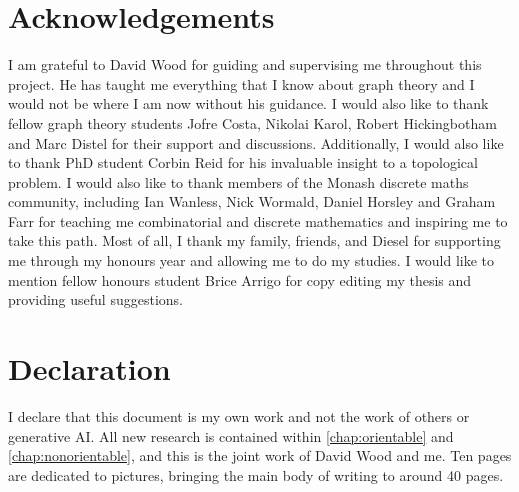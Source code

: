 \section*{Acknowledgements}
I am grateful to David Wood for guiding and supervising me throughout this project. He has taught me everything that I know about graph theory and I would not be where I am now without his guidance. I would also like to thank fellow graph theory students Jofre Costa, Nikolai Karol, Robert Hickingbotham and Marc Distel for their support and discussions. Additionally, I would also like to thank PhD student Corbin Reid for his invaluable insight to a topological problem. I would also like to thank members of the Monash discrete maths community, including Ian Wanless, Nick Wormald, Daniel Horsley and Graham Farr for teaching me combinatorial and discrete mathematics and inspiring me to take this path. Most of all, I thank my family, friends, and Diesel for supporting me through my honours year and allowing me to do my studies. I would like to mention fellow honours student Brice Arrigo for copy editing my thesis and providing useful suggestions.

\section*{Declaration}

I declare that this document is my own work and not the work of others or generative AI. All new research is contained within \cref{chap:orientable} and \cref{chap:nonorientable}, and this is the joint work of David Wood and me. Ten pages are dedicated to pictures, bringing the main body of writing to around 40 pages. 